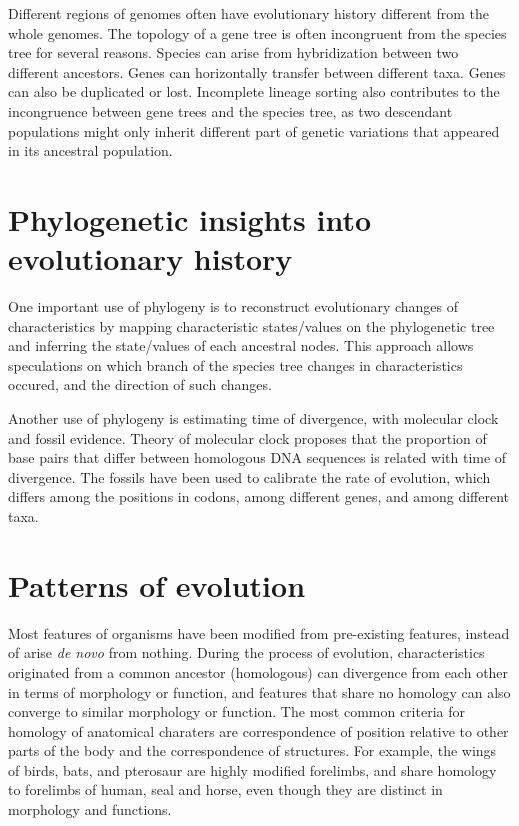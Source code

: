 \documentclass[11pt]{article}
\begin{document}
\begin{sloppypar}
\par

Different regions of genomes often have evolutionary history different from the whole genomes. 
The topology of a gene tree is often incongruent from the species tree for several reasons. 
Species can arise from hybridization between two different ancestors. 
Genes can horizontally transfer between different taxa. 
Genes can also be duplicated or lost. 
Incomplete lineage sorting also contributes to the incongruence between gene trees and the species tree, as two descendant populations might only inherit different part of genetic variations that appeared in its ancestral population. 

\section{Phylogenetic insights into evolutionary history}
One important use of phylogeny is to reconstruct evolutionary changes of characteristics by mapping characteristic states/values on the phylogenetic tree and inferring the state/values of each ancestral nodes. 
This approach allows speculations on which branch of the species tree changes in characteristics occured, and the direction of such changes. 

\par

Another use of phylogeny is estimating time of divergence, with molecular clock and fossil evidence. 
Theory of molecular clock proposes that the proportion of base pairs that differ between homologous DNA sequences is related with time of divergence. 
The fossils have been used to calibrate the rate of evolution, which differs among the positions in codons, among different genes, and among different taxa.  

\section{Patterns of evolution}
Most features of organisms have been modified from pre-existing features, instead of arise \textit{de novo} from nothing. 
During the process of evolution, characteristics originated from a common ancestor (homologous) can divergence from each other in terms of morphology or function, and features that share no homology can also converge to similar morphology or function. 
The most common criteria for homology of anatomical charaters are correspondence of position relative to other parts of the body and the correspondence of structures. 
For example, the wings of birds, bats, and pterosaur are highly modified forelimbs, and share homology to forelimbs of human, seal and horse, even though they are distinct in morphology and functions. 


\end{sloppypar}
\end{document}
